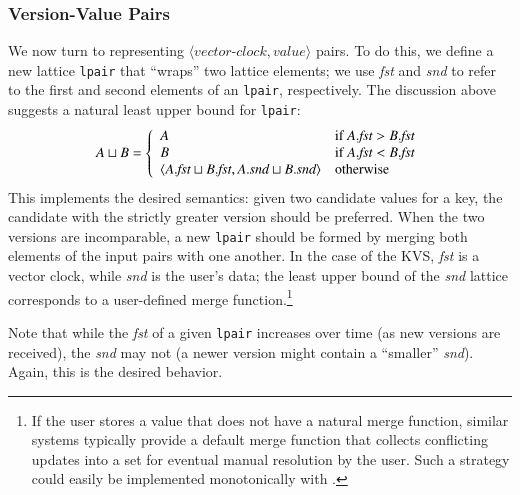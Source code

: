 \subsubsection{Version-Value Pairs}
We now turn to representing $\langle\textit{vector-clock},\textit{value}\rangle$
pairs. To do this, we define a new lattice \texttt{lpair} that ``wraps'' two
lattice elements; we use \emph{fst} and \emph{snd} to refer to the first and
second elements of an \texttt{lpair}, respectively. The discussion above
suggests a natural least upper bound for \texttt{lpair}:
\begin{displaymath}
  A \sqcup B = \left\{
    \begin{array}{l l}
      A & \textrm{if } A.\textit{fst} > B.\textit{fst} \\
      B & \textrm{if } A.\textit{fst} < B.\textit{fst} \\
      \langle A.\textit{fst} \sqcup B.\textit{fst}, A.\textit{snd} \sqcup B.\textit{snd}\rangle & \textrm{otherwise} \\
    \end{array} \right. 
\end{displaymath}
This implements the desired semantics: given two candidate values for a key, the
candidate with the strictly greater version should be preferred. When the
two versions are incomparable, a new \texttt{lpair} should be formed by merging
both elements of the input pairs with one another. In the case of the KVS,
\emph{fst} is a vector clock, while \emph{snd} is the user's data; the least
upper bound of the \emph{snd} lattice corresponds to a user-defined merge
function.\footnote{If the user stores a value that does not have a natural merge
  function, similar systems typically provide a default merge function that
  collects conflicting updates into a set for eventual manual resolution by the
  user. Such a strategy could easily be implemented monotonically with \lang.}

Note that while the \emph{fst} of a given \texttt{lpair} increases over time (as
new versions are received), the \emph{snd} may not (a newer version might
contain a ``smaller'' \emph{snd}). Again, this is the desired behavior.

